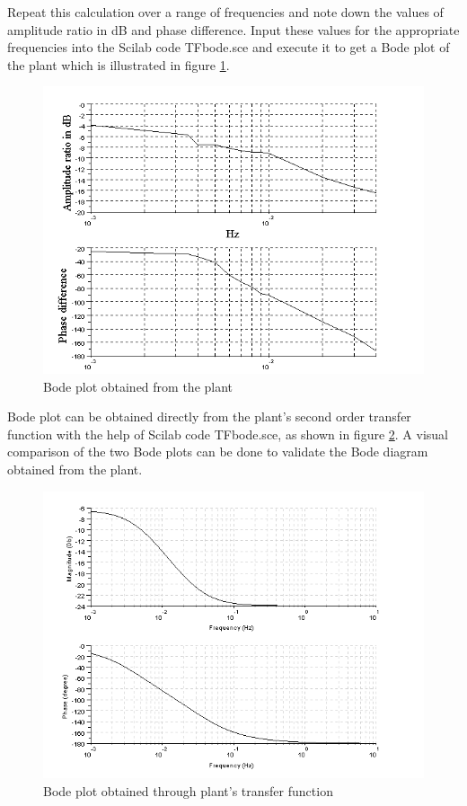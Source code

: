 Repeat this calculation over a range of frequencies and note down the values of amplitude ratio in dB and phase difference. 
Input these values for the appropriate frequencies into the Scilab code {\ttfamily TFbode.sce} and execute it to get a 
Bode plot of the plant which is illustrated in figure \ref{bode_plot}.
\begin{figure}
\includegraphics[width=\linewidth]{sinetest_manual/bodeplot}
\caption{Bode plot obtained from the plant}
\label{bode_plot}
\end{figure}

Bode plot can be obtained directly from the plant's second order transfer function \cite{kmm09} with the help of Scilab code
{\ttfamily TFbode.sce}, as shown in figure \ref{tfbode}. A visual comparison of the two Bode plots can be done to 
validate the Bode diagram obtained from the plant.
\begin{figure}
\includegraphics[width=\linewidth]{sinetest_manual/plant_bode_tf}
\caption{Bode plot obtained through plant's transfer function}
\label{tfbode}
\end{figure}

